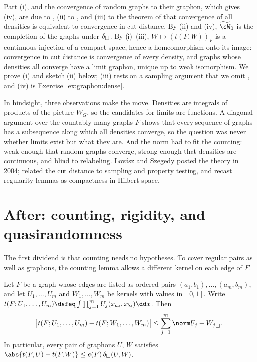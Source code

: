 \begin{refsection}
Part (i), and the convergence of random graphs to their graphon, which gives (iv), are due to \textcite{LovaszSzegedy2006}, (ii) to \textcite{LovaszSzegedy2007}, and (iii) to the theorem of \textcite{BorgsEtAl2008} that convergence of all densities is equivalent to convergence in cut distance. By (ii) and (iv), $\graphonspace$ is the completion of the graphs under $\delta_{\square}$. By (i)--(iii), $W\mapsto(t(F,W))_F$ is a continuous injection of a compact space, hence a homeomorphism onto its image: convergence in cut distance is convergence of every density, and graphs whose densities all converge have a limit graphon, unique up to weak isomorphism. We prove (i) and sketch (ii) below; (iii) rests on a sampling argument that we omit \parencite[see][]{BorgsEtAl2008,Lovasz2012}, and (iv) is Exercise~\ref{ex:graphon:dense}.

In hindsight, three observations make the move. Densities are integrals of products of the picture $W_G$, so the candidates for limits are functions. A diagonal argument over the countably many graphs $F$ shows that every sequence of graphs has a subsequence along which all densities converge, so the question was never whether limits exist but what they are. And the norm had to fit the counting: weak enough that random graphs converge, strong enough that densities are continuous, and blind to relabeling. Lov\'asz and Szegedy posted the theory in 2004; \textcite{BorgsEtAl2008} related the cut distance to sampling and property testing, and \textcite{LovaszSzegedy2007} recast regularity lemmas as compactness in Hilbert space.

\section{After: counting, rigidity, and quasirandomness}\label{sec:graphon:after-counting}

The first dividend is that counting needs no hypotheses. To cover regular pairs as well as graphons, the counting lemma allows a different kernel on each edge of $F$.

\begin{lemma}\label{lem:graphon:counting}
Let $F$ be a graph whose edges are listed as ordered pairs $(a_1,b_1),\dots,(a_m,b_m)$, and let $U_1,\dots,U_m$ and $W_1,\dots,W_m$ be kernels with values in $[0,1]$. Write $t(F;U_1,\dots,U_m)\defeq\int\prod_{j=1}^mU_j(x_{a_j},x_{b_j})\dd x$. Then
\[
  \bigl\lvert t(F;U_1,\dots,U_m)-t(F;W_1,\dots,W_m)\bigr\rvert\le\sum_{j=1}^m\graphoncut{U_j-W_j}.
\]
In particular, every pair of graphons $U$, $W$ satisfies $\abs{t(F,U)-t(F,W)}\le e(F)\,\graphondelta(U,W)$.
\end{lemma}


\end{refsection}
